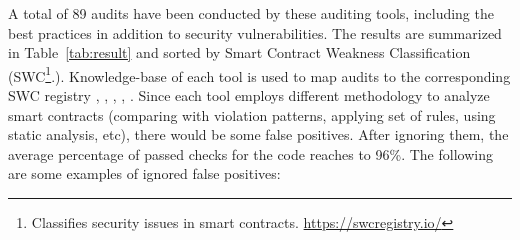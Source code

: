 \noindent A total of 89 audits have been conducted by these auditing tools, including the best practices in addition to security vulnerabilities. The results are summarized in Table~\ref{tab:result} and sorted by Smart Contract Weakness Classification (SWC\footnote{Classifies security issues in smart contracts. \url{https://swcregistry.io/}}.). Knowledge-base of each tool is used to map audits to the corresponding SWC registry \cite{SECURIFYGIT}, \cite{SMARTCHECK}, \cite{MythX}, \cite{ContractGuard}, \cite{SlitherDoc}. Since each tool employs different methodology to analyze smart contracts (\eg comparing with violation patterns, applying set of rules, using static analysis, etc), there would be some false positives. After ignoring them, the average percentage of passed checks for the code reaches to 96\%. The following are some examples of ignored false positives:
